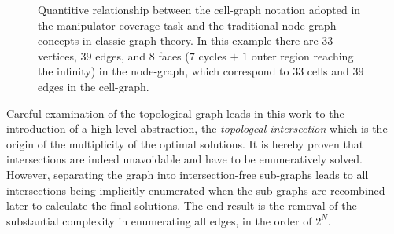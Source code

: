 \documentclass[journal]{IEEEtran}
\begin{document}
\begin{figure}[t]
\centering
{}
\caption{Quantitive relationship between the cell-graph notation adopted in the manipulator coverage task and the traditional node-graph concepts in classic graph theory. In this example there are $33$ vertices, $39$ edges, and $8$ faces ($7$ cycles $+$ $1$ outer region reaching the infinity) in the node-graph, which correspond to $33$ cells and $39$ edges in the cell-graph. }
\label{fig:node_graph}
\end{figure}


Careful examination of the topological graph leads in this work to the introduction of a high-level abstraction, the \textit{topologcal intersection} which is the origin of the multiplicity of the optimal solutions. It is hereby proven that intersections are indeed unavoidable and have to be enumeratively solved. However, separating the graph into intersection-free sub-graphs leads to all intersections being implicitly enumerated when the sub-graphs are recombined later to calculate the final solutions. The end result is the removal of the substantial complexity in enumerating all edges, in the order of $2^N$. 
\end{document}
